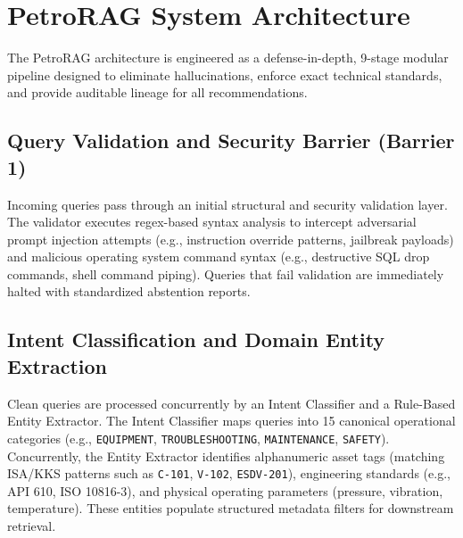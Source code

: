 \section{PetroRAG System Architecture}
\label{sec:architecture}

The PetroRAG architecture is engineered as a defense-in-depth, 9-stage modular pipeline designed to eliminate hallucinations, enforce exact technical standards, and provide auditable lineage for all recommendations.

\subsection{Query Validation and Security Barrier (Barrier 1)}
Incoming queries pass through an initial structural and security validation layer. The validator executes regex-based syntax analysis to intercept adversarial prompt injection attempts (e.g., instruction override patterns, jailbreak payloads) and malicious operating system command syntax (e.g., destructive SQL drop commands, shell command piping). Queries that fail validation are immediately halted with standardized abstention reports.

\subsection{Intent Classification and Domain Entity Extraction}
Clean queries are processed concurrently by an Intent Classifier and a Rule-Based Entity Extractor. The Intent Classifier maps queries into 15 canonical operational categories (e.g., \texttt{EQUIPMENT}, \texttt{TROUBLESHOOTING}, \texttt{MAINTENANCE}, \texttt{SAFETY}). Concurrently, the Entity Extractor identifies alphanumeric asset tags (matching ISA/KKS patterns such as \texttt{C-101}, \texttt{V-102}, \texttt{ESDV-201}), engineering standards (e.g., API 610, ISO 10816-3), and physical operating parameters (pressure, vibration, temperature). These entities populate structured metadata filters for downstream retrieval.

